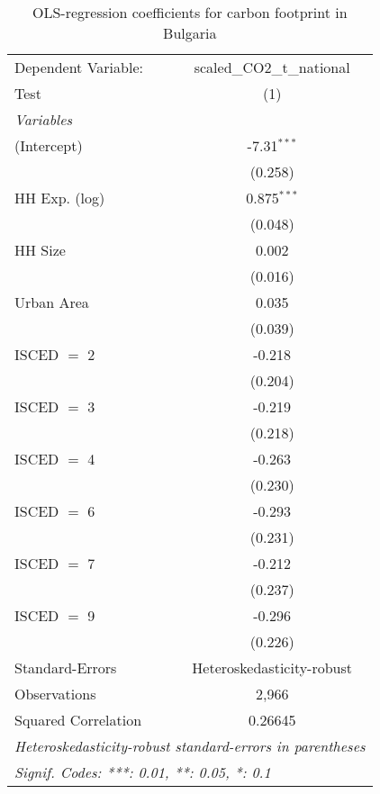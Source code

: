 
\begin{table}[htbp!]
   \centering
   \small
   \begin{adjustbox}{width = 1\textwidth, max height = 0.95\textheight, center}
      \begin{threeparttable}[b]
         \caption{\label{tab:OLS_2_BGR} OLS-regression coefficients for carbon footprint in Bulgaria}
         \begin{tabular}{lc}
            \tabularnewline \midrule \midrule
            Dependent Variable: & scaled\_CO2\_t\_national\\     
            Test                & (1)\\  
            \midrule
            \emph{Variables}\\
            (Intercept)         & -7.31$^{***}$\\   
                                & (0.258)\\   
            HH Exp. (log)       & 0.875$^{***}$\\   
                                & (0.048)\\   
            HH Size             & 0.002\\   
                                & (0.016)\\   
            Urban Area          & 0.035\\   
                                & (0.039)\\   
            ISCED $=$ 2         & -0.218\\   
                                & (0.204)\\   
            ISCED $=$ 3         & -0.219\\   
                                & (0.218)\\   
            ISCED $=$ 4         & -0.263\\   
                                & (0.230)\\   
            ISCED $=$ 6         & -0.293\\   
                                & (0.231)\\   
            ISCED $=$ 7         & -0.212\\   
                                & (0.237)\\   
            ISCED $=$ 9         & -0.296\\   
                                & (0.226)\\   
            \midrule 
            Standard-Errors     & Heteroskedasticity-robust \\   
            Observations        & 2,966\\  
            Squared Correlation & 0.26645\\  
            \midrule \midrule
            \multicolumn{2}{l}{\emph{Heteroskedasticity-robust standard-errors in parentheses}}\\
            \multicolumn{2}{l}{\emph{Signif. Codes: ***: 0.01, **: 0.05, *: 0.1}}\\
         \end{tabular}
         

\end{threeparttable}
\end{adjustbox}
\end{table}
